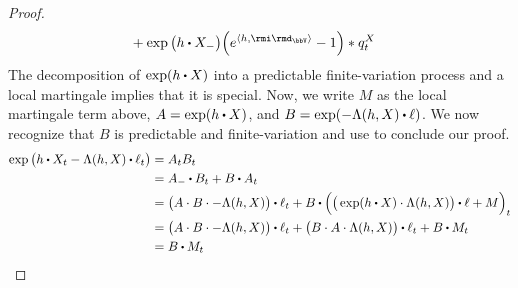 \begin{proof}
\begin{equation}
\begin{aligned}[t]
      &+ \exp\big(\twistFunc\shortInt\X_-\big) \Big( e^{\prj{\twistFunc}{\id_\vecSpace}} - 1 \Big) \ast \jumpMeas^\X_t
    \end{aligned} 
  \end{equation}
  The decomposition of $\exp(\twistFunc \shortInt \X)$ into a predictable finite-variation process and a  local martingale implies that it is special.
  Now, we write $M$ as the local martingale term above, $A = \exp(\twistFunc \shortInt \X)$, and $B = \exp(-\ode(\twistFunc, \X) \shortInt \leb)$.
  We now recognize that $B$ is predictable and finite-variation and use \cite[Proposition I.4.49(b)]{jacod2003} to conclude our proof.
  \begin{align*}
    \exp\big( \twistFunc \shortInt \X_t - \ode(\twistFunc, \X) \shortInt \leb_t \big) 
    &= A_t B_t \\
    &= A_- \shortInt B_t + B \shortInt A_t \\
    &= \big( A \cdot B \cdot -\ode(\twistFunc, \X) \big) \shortInt \leb_t + B \shortInt \Big( \big( \exp( \twistFunc \shortInt \X ) \cdot \ode(\twistFunc, \X) \big) \shortInt \leb + M \Big)_t \\
    &= \big( A \cdot B \cdot -\ode(\twistFunc, \X) \big) \shortInt \leb_t + \big( B \cdot A \cdot \ode(\twistFunc, \X) \big) \shortInt \leb_t + B \shortInt M_t \\
    &= B \shortInt M_t
  \end{align*}
\end{proof}
